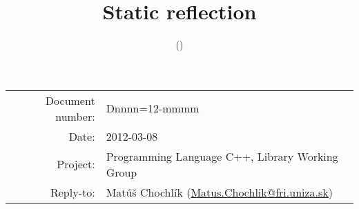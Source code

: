 \documentclass[11pt,a4paper,oneside]{article}
\title{Static reflection}
\author{\mchname (\mchmail)}
\makeatletter
\newcommand{\mchmail}{Matus.Chochlik@fri.uniza.sk}
\newcommand{\docnum}{Dnnnn=12-mmmm}
\newcommand{\docdate}{2012-03-08}
\makeatother
\begin{document}
\begin{tabular}{r l}
Document number: & \docnum\\
Date: & \docdate\\
Project: & Programming Language C++, Library Working Group \\
Reply-to: & Mat\'{u}\v{s} Chochl\'{i}k (\href{mailto:\mchmail}{\mchmail})\\
\end{tabular}


\tableofcontents










\end{document}

